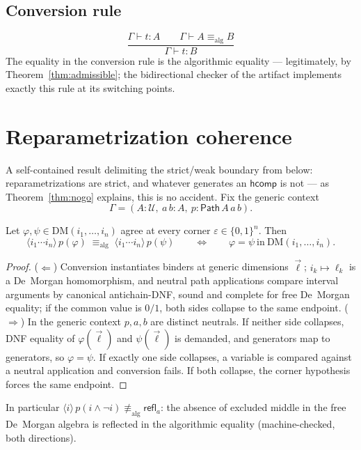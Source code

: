 \documentclass{lmcs}
\newcommand{\DM}[1]{\mathrm{DM}(#1)}
\newcommand{\hcomp}{\mathsf{hcomp}}
\newcommand{\refl}{\mathsf{refl}}
\newcommand{\aconv}{\equiv_{\mathrm{alg}}}
\newcommand{\Path}{\mathsf{Path}}
\newcommand{\U}{\mathcal{U}}
\begin{document}
\subsection{Conversion rule}

\[
  \frac{\Gamma \vdash t : A \qquad \Gamma \vdash A \aconv B}
       {\Gamma \vdash t : B}
\]
The equality in the conversion rule is the algorithmic equality ---
legitimately, by Theorem~\ref{thm:admissible}; the bidirectional
checker of the artifact implements exactly this rule at its
switching points.

\section{Reparametrization coherence}
\label{app:reparam}

A self-contained result delimiting the strict/weak boundary from
below: reparametrizations are strict, and whatever generates an
$\hcomp$ is not --- as Theorem~\ref{thm:nogo} explains, this is no
accident.  Fix the generic context
\[
  \Gamma = (A : \U,\ a\,b : A,\ p : \Path\,A\,a\,b).
\]

\begin{thm}\label{thm:reparam}
  Let $\varphi, \psi \in \DM{i_1,\dots,i_n}$ agree at every corner
  $\varepsilon \in \{0,1\}^n$.  Then
  \[
    \langle i_1 \cdots i_n \rangle\, p(\varphi)
    \;\aconv\;
    \langle i_1 \cdots i_n \rangle\, p(\psi)
    \qquad\Longleftrightarrow\qquad
    \varphi = \psi \ \text{in}\ \DM{i_1,\dots,i_n}.
  \]
\end{thm}
\begin{proof}
  ($\Leftarrow$) Conversion instantiates binders at generic
  dimensions $\vec\ell$; $i_k \mapsto \ell_k$ is a De~Morgan
  homomorphism, and neutral path applications compare interval
  arguments by canonical antichain-DNF, sound and complete for free
  De~Morgan equality; if the common value is $0/1$, both sides
  collapse to the same endpoint.  ($\Rightarrow$) In the generic
  context $p, a, b$ are distinct neutrals.  If neither side
  collapses, DNF equality of $\varphi(\vec\ell)$ and
  $\psi(\vec\ell)$ is demanded, and generators map to generators, so
  $\varphi = \psi$.  If exactly one side collapses, a variable is
  compared against a neutral application and conversion fails.  If
  both collapse, the corner hypothesis forces the same endpoint.
\end{proof}

\noindent In particular
$\langle i \rangle\, p(i \wedge \neg i) \not\aconv \refl_a$: the
absence of excluded middle in the free De~Morgan algebra is reflected
in the algorithmic equality (machine-checked, both directions).
\end{document}
